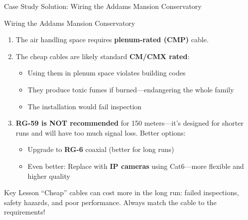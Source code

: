 \documentclass[aspectratio=169]{beamer}  %
\begin{document}
\begin{frame}{Case Study Solution: Wiring the Addams Mansion Conservatory}
    \begin{casesolution}{Wiring the Addams Mansion Conservatory}
        \begin{enumerate}
            \item The air handling space requires \textbf{plenum-rated (CMP)} cable.
            \item The cheap cables are likely standard \textbf{CM/CMX rated}:
                \begin{itemize}
                    \item Using them in plenum space violates building codes
                    \item They produce toxic fumes if burned---endangering the whole family
                    \item The installation would fail inspection
                \end{itemize}
            \item \textbf{RG-59 is NOT recommended} for 150 meters---it's designed for shorter runs and will have too much signal loss. Better options:
                \begin{itemize}
                    \item Upgrade to \textbf{RG-6} coaxial (better for long runs)
                    \item Even better: Replace with \textbf{IP cameras} using Cat6---more flexible and higher quality
                \end{itemize}
        \end{enumerate}
    \end{casesolution}
    
    \begin{alertblock}{Key Lesson}
        ``Cheap'' cables can cost more in the long run: failed inspections, safety hazards, and poor performance. Always match the cable to the requirements!
    \end{alertblock}
\end{frame}

\end{document}
